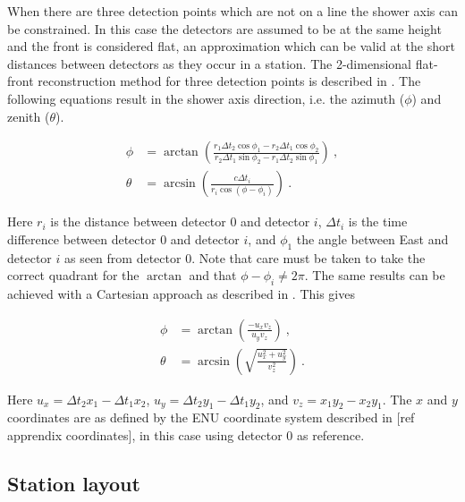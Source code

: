 When there are three detection points which are not on a line the shower axis can be constrained. In this case the detectors are assumed to be at the same height and the front is considered flat, an approximation which can be valid at the short distances between detectors as they occur in a station. The 2-dimensional flat-front reconstruction method for three detection points is described in \cite{fokkema2012hisparc}. The following equations result in the shower axis direction, i.e. the azimuth ($\phi$) and zenith ($\theta$).

\begin{equation}
    \label{eq:direction-2dflat}
    \begin{split}
        \phi &= \arctan \left(\frac{r_1 \Delta t_2 \cos \phi_1 - r_2 \Delta t_1 \cos \phi_2}{r_2 \Delta t_1 \sin \phi_2 - r_1 \Delta t_2 \sin \phi_1} \right) \ , \\
        \theta &= \arcsin \left(\frac{c \Delta t_i}{r_i \cos(\phi - \phi_i)} \right) \ .
    \end{split}
\end{equation}

Here $r_i$ is the distance between detector 0 and detector $i$, $\Delta t_i$ is the time difference between detector 0 and detector $i$, and $\phi_1$ the angle between East and detector $i$ as seen from detector 0. Note that care must be taken to take the correct quadrant for the $\arctan$ and that $\phi - \phi_i \ne 2 \pi$. The same results can be achieved with a Cartesian approach as described in \cite{montanus2015direction}. This gives

\begin{equation}
    \label{eq:direction-2dflat}
    \begin{split}
        \phi &= \arctan \left(\frac{-u_x v_z}{u_y v_z} \right) \ , \\
        \theta &= \arcsin \left(\sqrt{\frac{u_x^2+u_y^2}{v_z^2}} \right) \ .
    \end{split}
\end{equation}

Here $u_x = \Delta t_2 x_1 - \Delta t_1 x_2$, $u_y = \Delta t_2 y_1 - \Delta t_1 y_2$, and $v_z = x_1 y_2 - x_2 y_1$. The $x$ and $y$ coordinates are as defined by the ENU coordinate system described in [ref apprendix coordinates], in this case using detector 0 as reference.

\subsection{Station layout}
\label{ssec:station_layout}

